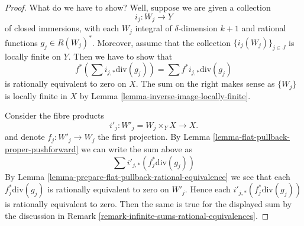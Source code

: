 \documentclass[10pt,a4paper]{amsart}
\theoremstyle{plain}
\theoremstyle{definition}
\theoremstyle{remark}
\numberwithin{equation}{subsection}
\begin{document}
\begin{proof}
What do we have to show? Well, suppose we are given a collection
$$
i_j : W_j \longrightarrow Y
$$
of closed immersions, with each $W_j$ integral of $\delta$-dimension $k + 1$
and rational functions $g_j \in R(W_j)^*$. Moreover, assume that
the collection $\{i_j(W_j)\}_{j \in J}$ is locally finite on $Y$.
Then we have to show that
$$
f^*(\sum i_{j, *}\text{div}(g_j)) = \sum f^*i_{j, *}\text{div}(g_j)
$$
is rationally equivalent to zero on $X$. The sum on the right
makes sense as $\{W_j\}$ is locally finite in $X$ by
Lemma \ref{lemma-inverse-image-locally-finite}.

\medskip\noindent
Consider the fibre products
$$
i'_j : W'_j = W_j \times_Y X \longrightarrow X.
$$
and denote $f_j : W'_j \to W_j$ the first projection.
By Lemma \ref{lemma-flat-pullback-proper-pushforward}
we can write the sum above as
$$
\sum i'_{j, *}(f_j^*\text{div}(g_j))
$$
By Lemma \ref{lemma-prepare-flat-pullback-rational-equivalence}
we see that each $f_j^*\text{div}(g_j)$ is rationally equivalent
to zero on $W'_j$. Hence each $i'_{j, *}(f_j^*\text{div}(g_j))$
is rationally equivalent to zero. Then the same is true for
the displayed sum by the discussion in
Remark \ref{remark-infinite-sums-rational-equivalences}.
\end{proof}
\end{document}
